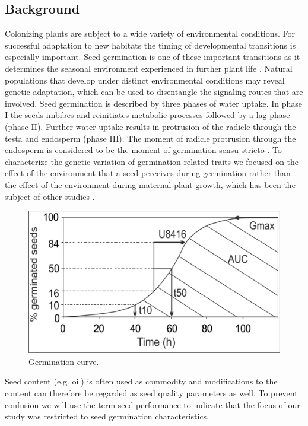 \subsection{Background}
Colonizing plants are subject to a wide variety of environmental conditions. For successful adaptation 
to new habitats the timing of developmental transitions is especially important. Seed germination is 
one of these important transitions as it determines the seasonal environment experienced in further 
plant life \cite{Huang:2010}. Natural populations that develop under distinct environmental conditions 
may reveal genetic adaptation, which can be used to disentangle the signaling routes that are involved. 
Seed germination is described by three phases of water uptake. In phase I the seeds imbibes and 
reinitiates metabolic processes followed by a lag phase (phase II). Further water uptake results in 
protrusion of the radicle through the testa and endosperm (phase III). The moment of radicle 
protrusion through the endosperm is considered to be the moment of germination sensu stricto 
\cite{Finch-Savage:2006}. To characterize the genetic variation of germination related traits we 
focused on the effect of the environment that a seed perceives during germination rather than the 
effect of the environment during maternal plant growth, which has been the subject of other 
studies \cite{Dechaine:2009, Elwell:2011}. 

\begin{figure}[h!]
  \centering
  \includegraphics[keepaspectratio,scale=0.30]{eps/image_3_1_1.eps}
  \caption[Germination curve.]
    {Germination curve.}
\end{figure}

Seed content (e.g. oil) is often used as commodity and modifications to the content can therefore be 
regarded as seed quality parameters as well. To prevent confusion we will use the term seed performance 
to indicate that the focus of our study was restricted to seed germination characteristics.

